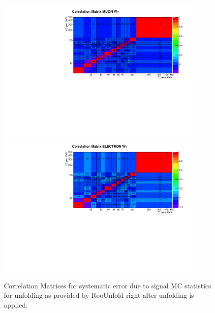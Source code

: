 \begin{figure}[htb]
  \begin{center}
   \includegraphics[width=0.90\textwidth]{../figs/figs_v11/MUON_WGamma/Constants/matrCorrelation_unf_MC_stat.pdf}\\
\includegraphics[width=0.90\textwidth]{../figs/figs_v11/ELECTRON_WGamma/Constants/matrCorrelation_unf_MC_stat.pdf}
  \caption{Correlation Matrices for systematic error due to signal MC statistics for unfolding as provided by RooUnfold right after unfolding is applied.}
  \label{fig:corrMatrices_syst_unf_MC_stat_Wg}
  \end{center}
\end{figure}

